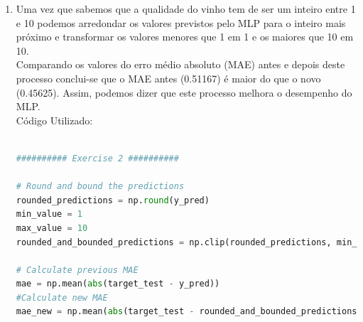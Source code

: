 \documentclass[a4paper,12pt]{article} %
\begin{document}
\begin{enumerate}
\begin{lstlisting}[language=Python]
# Training Test Split
variables_train, variables_test, target_train, target_test= train_test_split(variables, target, 
                                                                            train_size=0.8, stratify=target, random_state=0)

y_pred = np.zeros(len(target_test))

# Average the mlp regressor
for i in range(1, 11):
    # Learn the MLP regressor 
    mlp = MLPRegressor(hidden_layer_sizes=(10,10), activation='relu', early_stopping=True, validation_fraction=0.2, random_state=i)
    #Predict output
    y_pred += mlp.fit(variables_train,target_train).predict(variables_test)

y_pred = y_pred/10
first_rmse = np.sqrt(np.mean((target_test - y_pred)**2))

######### Exercise 1 ##########

# Calculate the residues
residues = abs(target_test - y_pred)
# Plot the residues

plt.hist(residues, edgecolor='darkblue', bins=20)
plt.title('Histogram of the residues')
plt.xlabel('Residues')
plt.ylabel('Frequency')
plt.savefig('ex1_histogram.png')
plt.show()
    
\end{lstlisting}

\item Uma vez que sabemos que a qualidade do vinho tem de ser um inteiro entre 
1 e 10 podemos arredondar os valores previstos pelo MLP para o inteiro mais próximo
e transformar os valores menores que 1 em 1 e os maiores que 10 em 10.\\ Comparando 
os valores do erro médio absoluto (MAE) antes e depois deste processo conclui-se 
que o MAE antes (0.51167) é maior do que o novo (0.45625). Assim, podemos dizer que 
este processo melhora o desempenho do MLP.\\

Código Utilizado:

\begin{lstlisting}[language=Python]

########## Exercise 2 ##########

# Round and bound the predictions
rounded_predictions = np.round(y_pred)
min_value = 1
max_value = 10 
rounded_and_bounded_predictions = np.clip(rounded_predictions, min_value, max_value)

# Calculate previous MAE
mae = np.mean(abs(target_test - y_pred))
#Calculate new MAE
mae_new = np.mean(abs(target_test - rounded_and_bounded_predictions))


\end{lstlisting}
\end{enumerate}
\end{document}
